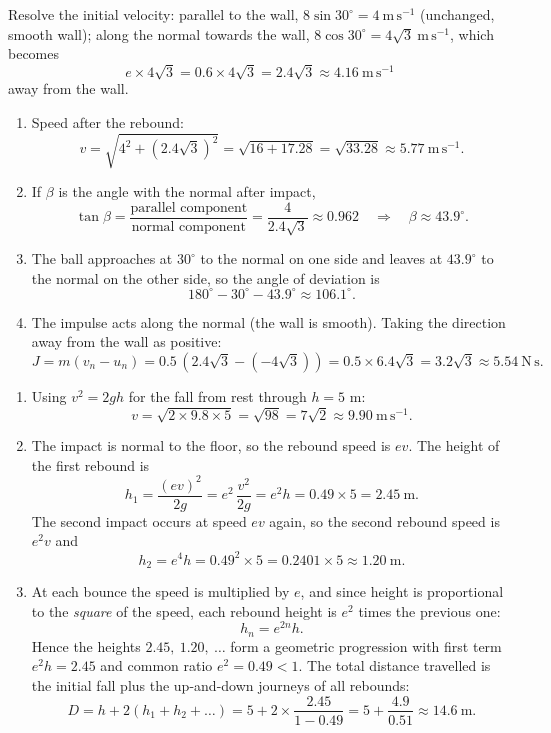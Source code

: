 \documentclass[11pt]{article}
\begin{document}
\begin{corrige}
Resolve the initial velocity: parallel to the wall, $8\sin 30^{\circ}=4\ \mathrm{m\,s^{-1}}$ (unchanged, smooth wall); along the normal towards the wall, $8\cos 30^{\circ}=4\sqrt3\ \mathrm{m\,s^{-1}}$, which becomes
\[ e\times 4\sqrt3=0.6\times 4\sqrt3=2.4\sqrt3\approx 4.16\ \mathrm{m\,s^{-1}} \]
away from the wall.
\begin{enumerate}
\item Speed after the rebound:
\[ v=\sqrt{4^{2}+(2.4\sqrt3)^{2}}=\sqrt{16+17.28}=\sqrt{33.28}\approx 5.77\ \mathrm{m\,s^{-1}}. \]
\item If $\beta$ is the angle with the normal after impact,
\[ \tan\beta=\frac{\text{parallel component}}{\text{normal component}}=\frac{4}{2.4\sqrt3}\approx 0.962\quad\Longrightarrow\quad \beta\approx 43.9^{\circ}. \]
\item The ball approaches at $30^{\circ}$ to the normal on one side and leaves at $43.9^{\circ}$ to the normal on the other side, so the angle of deviation is
\[ 180^{\circ}-30^{\circ}-43.9^{\circ}\approx 106.1^{\circ}. \]
\item The impulse acts along the normal (the wall is smooth). Taking the direction away from the wall as positive:
\[ J=m(v_{n}-u_{n})=0.5\,(2.4\sqrt3-(-4\sqrt3))=0.5\times 6.4\sqrt3=3.2\sqrt3\approx 5.54\ \mathrm{N\,s}. \]
\end{enumerate}
\end{corrige}

\begin{corrige}
\begin{enumerate}
\item Using $v^{2}=2gh$ for the fall from rest through $h=5$ m:
\[ v=\sqrt{2\times 9.8\times 5}=\sqrt{98}=7\sqrt2\approx 9.90\ \mathrm{m\,s^{-1}}. \]
\item The impact is normal to the floor, so the rebound speed is $ev$. The height of the first rebound is
\[ h_{1}=\frac{(ev)^{2}}{2g}=e^{2}\,\frac{v^{2}}{2g}=e^{2}h=0.49\times 5=2.45\ \mathrm{m}. \]
The second impact occurs at speed $ev$ again, so the second rebound speed is $e^{2}v$ and
\[ h_{2}=e^{4}h=0.49^{2}\times 5=0.2401\times 5\approx 1.20\ \mathrm{m}. \]
\item At each bounce the speed is multiplied by $e$, and since height is proportional to the \emph{square} of the speed, each rebound height is $e^{2}$ times the previous one:
\[ h_{n}=e^{2n}h. \]
Hence the heights $2.45,\ 1.20,\ \dots$ form a geometric progression with first term $e^{2}h=2.45$ and common ratio $e^{2}=0.49<1$. The total distance travelled is the initial fall plus the up-and-down journeys of all rebounds:
\[ D=h+2\left(h_{1}+h_{2}+\dots\right)=5+2\times\frac{2.45}{1-0.49}=5+\frac{4.9}{0.51}\approx 14.6\ \mathrm{m}. \]
\end{enumerate}
\end{corrige}
\end{document}
